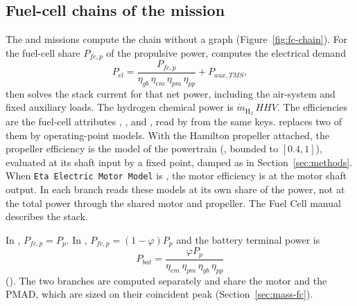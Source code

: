 \documentclass[a4paper,11pt]{article}
\begin{document}
\subsection{Fuel-cell chains of the mission}\label{sec:fc-chains}
The  and  missions compute the chain without a
graph (Figure~\ref{fig:fc-chain}). For the fuel-cell share $P_{fc,p}$ of the propulsive
power,  computes the electrical demand
\begin{equation}
  P_{el} = \frac{P_{fc,p}}{\eta_{gb}\,\eta_{em}\,\eta_{pm}\,\eta_{pp}} + P_{aux,TMS},
  \label{eq:fc-el}
\end{equation}
then solves the stack current for that net power, including the air-system and fixed
auxiliary loads. The hydrogen chemical power is $\dot m_{\mathrm{H_2}}\,HHV$. The
efficiencies are the fuel-cell attributes , ,  and
, read by  from the same  keys.
 replaces two of them by operating-point models. With the
Hamilton propeller attached, the propeller efficiency is the  model of the
powertrain (, bounded to $[0.4, 1]$), evaluated at its
shaft input by a fixed point, damped as in Section~\ref{sec:methods}. When \texttt{Eta Electric Motor Model} is , the
motor efficiency is  at the motor shaft output. In
 each branch reads these models at its own share of the power, not at
the total power through the shared motor and propeller. The Fuel Cell manual describes the
stack.

In , $P_{fc,p} = P_p$. In , $P_{fc,p} =
(1-\varphi)P_p$ and the battery terminal power is
\begin{equation}
  P_{bat} = \frac{\varphi P_p}{\eta_{em}\,\eta_{pm}\,\eta_{gb}\,\eta_{pp}}
  \label{eq:fcb-bat}
\end{equation}
(). The two branches are computed separately and
share the motor and the PMAD, which are sized on their coincident peak
(Section~\ref{sec:mass-fc}).
\end{document}
